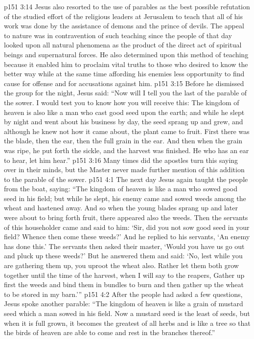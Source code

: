 \vs p151 3:14 Jesus also resorted to the use of parables as the best possible refutation of the studied effort of the religious leaders at Jerusalem to teach that all of his work was done by the assistance of demons and the prince of devils. The appeal to nature was in contravention of such teaching since the people of that day looked upon all natural phenomena as the product of the direct act of spiritual beings and supernatural forces. He also determined upon this method of teaching because it enabled him to proclaim vital truths to those who desired to know the better way while at the same time affording his enemies less opportunity to find cause for offense and for accusations against him.
\vs p151 3:15 Before he dismissed the group for the night, Jesus said: \textcolor{ubdarkred}{“Now will I tell you the last of the parable of the sower. I would test you to know how you will receive this: The kingdom of heaven is also like a man who cast good seed upon the earth; and while he slept by night and went about his business by day, the seed sprang up and grew, and although he knew not how it came about, the plant came to fruit. First there was the blade, then the ear, then the full grain in the ear. And then when the grain was ripe, he put forth the sickle, and the harvest was finished. He who has an ear to hear, let him hear.”}
\vs p151 3:16 Many times did the apostles turn this saying over in their minds, but the Master never made further mention of this addition to the parable of the sower.
\vs p151 4:1 The next day Jesus again taught the people from the boat, saying: \textcolor{ubdarkred}{“The kingdom of heaven is like a man who sowed good seed in his field; but while he slept, his enemy came and sowed weeds among the wheat and hastened away. And so when the young blades sprang up and later were about to bring forth fruit, there appeared also the weeds. Then the servants of this householder came and said to him: ‘Sir, did you not sow good seed in your field? Whence then come these weeds?’ And he replied to his servants, ‘An enemy has done this.’ The servants then asked their master, ‘Would you have us go out and pluck up these weeds?’ But he answered them and said: ‘No, lest while you are gathering them up, you uproot the wheat also. Rather let them both grow together until the time of the harvest, when I will say to the reapers, Gather up first the weeds and bind them in bundles to burn and then gather up the wheat to be stored in my barn.’”}
\vs p151 4:2 \pc After the people had asked a few questions, Jesus spoke another parable: \textcolor{ubdarkred}{“The kingdom of heaven is like a grain of mustard seed which a man sowed in his field. Now a mustard seed is the least of seeds, but when it is full grown, it becomes the greatest of all herbs and is like a tree so that the birds of heaven are able to come and rest in the branches thereof.”}
